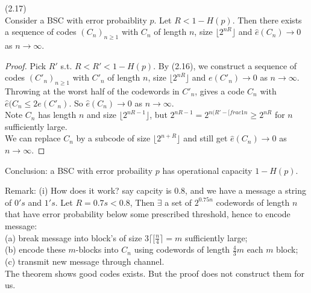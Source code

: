 \documentclass[a4paper]{article}
\begin{document}
\begin{prop} (2.17)\\
Consider a BSC with error probaiblity $p$. Let $R<1-H(p)$. Then there exists a sequence of codes $(C_n)_{n \geq 1}$ with $C_n$ of length $n$, size $\lfloor 2^{nR}\rfloor$ and $\hat{e}(C_n) \to 0$ as $n \to \infty$.
\begin{proof}
Pick $R'$ s.t. $R < R' < 1-H(p)$. By (2.16), we construct a sequence of codes $(C'_n)_{n \geq 1}$ with $C'_n$ of length $n$, size $\lfloor 2^{nR} \rfloor$ and $e(C'_n) \to 0$ as $n \to \infty$.\\
Throwing at the worst half of the codewords in $C'_n$, gives a code $C_n$ with $\hat{e}(C_n \leq 2e(C'_n)$. So $\hat{e}(C_n) \to 0$ as $n \to \infty$.\\
Note $C_n$ has length $n$ and size $\lfloor 2^{nR-1} \rfloor$, but $2^{nR-1} = 2^{n(R'-[frac{1}{n}} \geq 2^{nR}$ for $n$ sufficiently large.\\
We can replace $C_n$ by a subcode of size $\lfloor 2^{n+R}\rfloor$ and still get $\hat{e}(C_n) \to 0$ as $n \to \infty$.
\end{proof}
\end{prop}

Conclusion: a BSC with error probaility $p$ has operational capacity $1-H(p)$.

Remark: (i) How does it work? say capcity is 0.8, and we have a message a string of $0's$ and $1's$. Let $R=0.7s < 0.8$, Then $\exists$ a set of $2^{0.75n}$ codewords of length $n$ that have error probability below some prescribed threshold, hence to encode message:\\
(a) break message into block's of size $3\lceil[\frac{n}{4}\rceil = m$ sufficiently large;\\
(b) encode these $m$-blocks into $C_n$ using codewords of length $\frac{4}{3} m$ each $m$ block;\\
(c) transmit new message through channel.\\

The theorem shows good codes exists. But the proof does not construct them for us.

\end{document}
